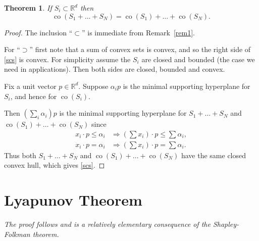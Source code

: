\documentclass[a4paper]{amsart}
\theoremstyle{plain}
\newtheorem{theorem}{Theorem}[section]
\theoremstyle{definition}
\theoremstyle{remark}
\DeclareMathOperator{\co}{co}
\begin{document}
\begin{theorem} If $ S_i \subset \mathbb{R}^d  $ then 
\begin{equation} \label{scs} 
\co(S_1 + \dots + S_N) = \co (S_1) + \dots + \co (S_N) .
\end{equation} 
\end{theorem}

\begin{proof}
The inclusion ``$ \subset $'' is immediate from Remark~\ref{rem1}.

\medskip 
For ``$ \supset $'' first note that a sum of convex sets is convex, and so the right side of \eqref{scs} is  convex.
 For simplicity assume the $ S_i $ are closed and bounded (the case we need in   applications).  Then both sides are closed, bounded and convex.
 
Fix a unit vector $ p \in \mathbb{R}^d  $. Suppose $ \alpha _i p $ is the minimal supporting hyperplane for $ S_i $, and hence for $ \co (S_i )$. 

Then $ (\sum_i \alpha _i ) p $ is the minimal supporting hyperplane for $ S_1 + \dots +S_N $ and $ \co (S_1)+ \dots + \co(S_N) $ since
\begin{align*} 
x_i \cdot p \leq \alpha _i &\Longrightarrow \left(\sum x_i\right)  \cdot p \leq  \sum\alpha _i  ,\\
x_i \cdot p = \alpha _i &\Longrightarrow \left(\sum x_i\right)  \cdot p = \sum \alpha _i  .
\end{align*}  
Thus both  $ S_1 + \dots +S_N $ and $ \co (S_1)+ \dots + \co(S_N) $ have the same closed convex hull, which gives \eqref{scs}.
\end{proof} 

 



\section{\textbf{Lyapunov Theorem}}  
\noindent \emph{The proof follows \cite{Tar} and is a relatively elementary consequence of the Shapley-Folkman theorem.}
\end{document}
